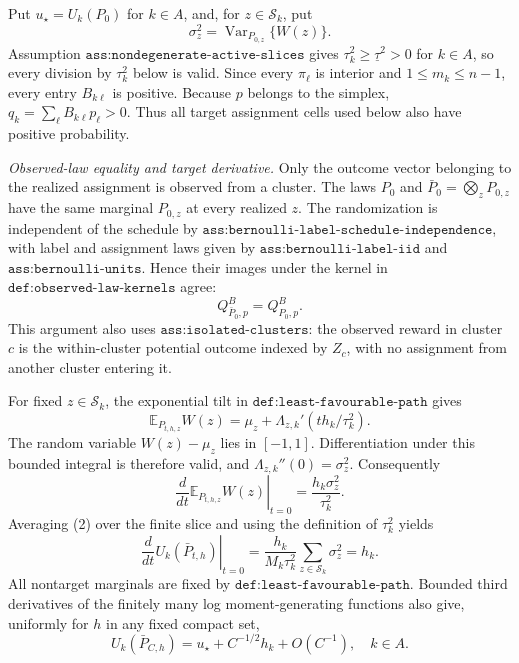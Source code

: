 Put \(u_\star=U_k(P_0)\) for \(k\in A\), and, for \(z\in\mathcal S_k\), put
\[
 \sigma_z^2=\operatorname{Var}_{P_{0,z}}\{W(z)\}.
\]
Assumption \(\texttt{ass:nondegenerate-active-slices}\) gives \(\tau_k^2\geq\underline\tau^2>0\) for \(k\in A\), so every division by \(\tau_k^2\) below is valid.  Since every \(\pi_\ell\) is interior and \(1\leq m_k\leq n-1\), every entry \(B_{k\ell}\) is positive.  Because \(p\) belongs to the simplex, \(q_k=\sum_\ell B_{k\ell}p_\ell>0\).  Thus all target assignment cells used below also have positive probability.

\emph{Observed-law equality and target derivative.}
Only the outcome vector belonging to the realized assignment is observed from a cluster.  The laws \(P_0\) and \(\bar P_0=\bigotimes_zP_{0,z}\) have the same marginal \(P_{0,z}\) at every realized \(z\).  The randomization is independent of the schedule by \(\texttt{ass:bernoulli-label-schedule-independence}\), with label and assignment laws given by \(\texttt{ass:bernoulli-label-iid}\) and \(\texttt{ass:bernoulli-units}\).  Hence their images under the kernel in \(\texttt{def:observed-law-kernels}\) agree:
\[
 Q^B_{\bar P_0,p}=Q^B_{P_0,p}.                                      \tag{1}
\]
This argument also uses \(\texttt{ass:isolated-clusters}\): the observed reward in cluster \(c\) is the within-cluster potential outcome indexed by \(Z_c\), with no assignment from another cluster entering it.

For fixed \(z\in\mathcal S_k\), the exponential tilt in \(\texttt{def:least-favourable-path}\) gives
\[
 \mathbb E_{P_{t,h,z}}W(z)
 =\mu_z+\Lambda_{z,k}'(t h_k/\tau_k^2).
\]
The random variable \(W(z)-\mu_z\) lies in \([-1,1]\).  Differentiation under this bounded integral is therefore valid, and \(\Lambda_{z,k}''(0)=\sigma_z^2\).  Consequently
\[
 \left.\frac{d}{dt}\mathbb E_{P_{t,h,z}}W(z)\right|_{t=0}
 =\frac{h_k\sigma_z^2}{\tau_k^2}.                                  \tag{2}
\]
Averaging (2) over the finite slice and using the definition of \(\tau_k^2\) yields
\[
 \left.\frac{d}{dt}U_k(\bar P_{t,h})\right|_{t=0}
 =\frac{h_k}{M_k\tau_k^2}\sum_{z\in\mathcal S_k}\sigma_z^2
 =h_k.                                                               \tag{3}
\]
All nontarget marginals are fixed by \(\texttt{def:least-favourable-path}\).  Bounded third derivatives of the finitely many log moment-generating functions also give, uniformly for \(h\) in any fixed compact set,
\[
 U_k(\bar P_{C,h})=u_\star+C^{-1/2}h_k+O(C^{-1}),\quad k\in A.      \tag{4}
\]

